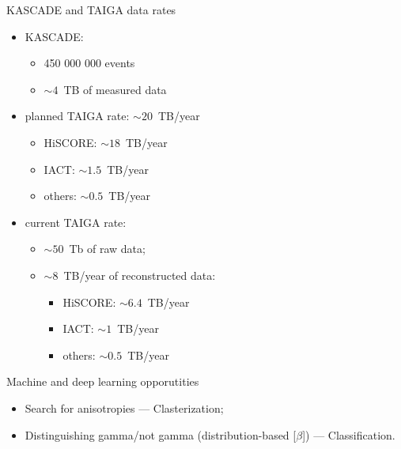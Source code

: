 \begin{frame}{KASCADE and TAIGA data rates}
\begin{minipage}[c]{0.52\textwidth}
  \begin{itemize}
    \item KASCADE:
    \begin{itemize}
      \item 450 000 000 events
      \item $\sim 4$~TB of measured data
    \end{itemize}
    \vspace{1em}
    \item planned TAIGA rate: $\sim 20$~TB/year
    \begin{itemize}
      \item HiSCORE: $\sim 18$~TB/year
      \item IACT: $\sim 1.5$~TB/year
      \item others: $\sim 0.5$~TB/year
    \end{itemize}
  \end{itemize}
\end{minipage}
\hfill
\begin{minipage}[c]{0.47\textwidth}
\vspace{-3.5em}
  \begin{itemize}
    \item current TAIGA rate: 
    \begin{itemize}
      \item $\sim 50$~Tb of raw data;
      \item $\sim 8$~TB/year of reconstructed data:
      \begin{itemize}
	\item HiSCORE: $\sim 6.4$~TB/year
	\item IACT: $\sim 1$~TB/year
	\item others: $\sim 0.5$~TB/year
      \end{itemize}
    \end{itemize}
  \end{itemize}
\end{minipage}

\end{frame}

\begin{frame}{Machine and deep learning opporutities}
 \begin{itemize}
  \item Search for anisotropies --- Clasterization;
  \item Distinguishing gamma/not gamma (distribution-based [$\beta$]) --- Classification.
 \end{itemize}

\end{frame}
